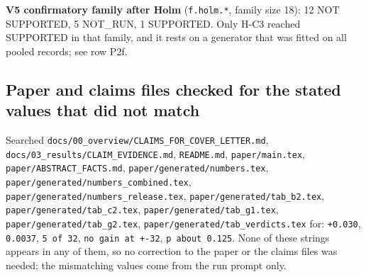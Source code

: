 \textbf{V5 confirmatory family after Holm} (\texttt{f.holm.*}, family size 18): 12 NOT SUPPORTED, 5 NOT\_RUN, 1 SUPPORTED. Only H-C3 reached SUPPORTED in that family, and it rests on a generator that was fitted on all pooled records; see row P2f.


\subsection*{Paper and claims files checked for the stated values that did not match}

Searched \texttt{docs/00\_overview/CLAIMS\_FOR\_COVER\_LETTER.md}, \texttt{docs/03\_results/CLAIM\_EVIDENCE.md}, \texttt{README.md}, \texttt{paper/main.tex}, \texttt{paper/ABSTRACT\_FACTS.md}, \texttt{paper/generated/numbers.tex}, \texttt{paper/generated/numbers\_combined.tex}, \texttt{paper/generated/numbers\_release.tex}, \texttt{paper/generated/tab\_b2.tex}, \texttt{paper/generated/tab\_c2.tex}, \texttt{paper/generated/tab\_g1.tex}, \texttt{paper/generated/tab\_g2.tex}, \texttt{paper/generated/tab\_verdicts.tex} for: \texttt{+0.030}, \texttt{0.0037}, \texttt{5 of 32}, \texttt{no gain at +-32}, \texttt{p about 0.125}. None of these strings appears in any of them, so no correction to the paper or the claims files was needed; the mismatching values come from the run prompt only.

